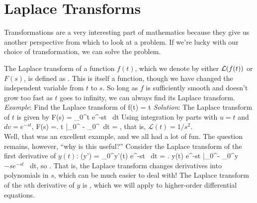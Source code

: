 \documentclass[12pt]{book}
\begin{document}
\chapter{Laplace Transforms}

Transformations are a very interesting part of mathematics because they give us
another perspective from which to look at a problem. If we're lucky with
our choice of transformation, we can solve the problem.

The Laplace transform of a function $f(t)$, which we denote by either
$\mathcal{L}(f(t))$ or $F(s)$, is defined as
\be
{}.
\ee
This is itself a function, though we have changed the independent variable
from $t$ to $s$. So long as $f$ is sufficiently smooth and doesn't grow too
fast as $t$ goes to infinity, we can always find its Laplace transform.\\

\noindent\emph{Example}: Find the Laplace transform of
\be
f(t) = t
\ee
\noindent\emph{Solution}: The Laplace transform of $t$ is given by
\be
F(s) = \int_0^\infty t e^{-st} \, dt
\ee
Using integration by parts with $u=t$ and $dv=e^{-st}$,
\be
F(s) =\left. t  \right|_0^\infty
- \int_0^\infty {}\, dt
= ,
\ee
that is, $\mathcal{L}(t)= 1/s^2$.\\

Well, that was an excellent example, and we all had a lot of fun. The question
remains, however, ``why is this useful?'' Consider the Laplace transform of
the first derivative of $y(t)$:
\be
\Laplace(y') = \int_0^\infty y'(t) e^{-st} \, dt
= \left. y(t) e^{-st} \right|_0^\infty - \int_0^\infty y \(-s e^{-st}\) \, dt,
\ee
so
\be
{}.
\ee
That is, the Laplace transform changes derivatives into polynomials in $s$,
which can be much easier to deal with!
The Laplace transform of the $n$th derivative of $y$ is
\be
{},
\ee
which we will apply to higher-order differential equations.

\end{document}
